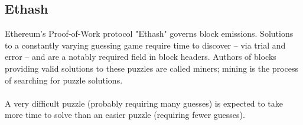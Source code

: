 \documentclass[11pt]{article}
\theoremstyle{plain}
\begin{document}
\subsection{\small{Ethash}}\label{sec: S1.1}

Ethereum's Proof-of-Work protocol "Ethash" governs block emissions. Solutions
to a constantly varying guessing game require time to discover -- via trial and
error -- and are a notably required field in block headers. Authors of blocks
providing valid solutions to these puzzles are called miners; mining is the
process of searching for puzzle solutions. \\
\\
A very difficult puzzle (probably requiring many guesses) is expected to take 
more time to solve than an easier puzzle (requiring fewer guesses).
\end{document}
